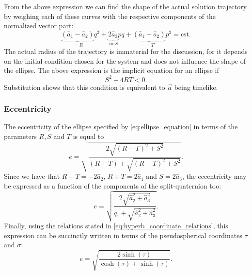 From the above expression we can find the shape of the actual solution trajectory by weighing each of these curves with the respective components of the normalized vector part:
\begin{equation}
    \underbrace{(\hat{a}_1 - \hat{a}_2)}_{\coloneq R} q^2 + \underbrace{2 \hat{a}_3}_{\coloneq S} pq + \underbrace{(\hat{a}_1 + \hat{a}_2)}_{\coloneq T} p^2 = \text{cst}.
    \label{eq:ellipse_equation}
\end{equation}
The actual radius of the trajectory is immaterial for the discussion, for it depends on the initial condition chosen for the system and does not influence the shape of the ellipse. 
The above expression is the implicit equation for an ellipse if \cite{Rapp1991}
\begin{equation}
    S^2 - 4RT < 0.
\end{equation}
Substitution shows that this condition is equivalent to \(\vec{a}\) being timelike. 

\subsubsection{Eccentricity} The eccentricity of the ellipse specified by \cref{eq:ellipse_equation} in terms of the parameters \(R, S\) and  \(T\) is equal to \cite{Rapp1991}
\begin{equation}
    e = \sqrt{\frac{2\sqrt{(R - T)^2 + S^2}}{(R + T) + \sqrt{(R - T)^2 + S^2}}}.
    \label{eq:eccentricity}
\end{equation}
Since we have that \(R - T = -2\hat{a}_2\), \(R + T = 2\hat{a}_1\) and \(S = 2\hat{a}_3\), the eccentricity may be expressed as a function of the components of the split-quaternion too:
\begin{equation}
    e = \sqrt{\frac{2\sqrt{\hat{a}_2^2 + \hat{a}_3^2}}{q_1 + \sqrt{\hat{a}_2^2 + \hat{a}_3^2}}}.
\end{equation}
Finally, using the relations stated in \cref{eq:hyperb_coordinate_relations}, this expression can be succinctly written in terms of the pseudospherical coordinates $\tau$ and $\sigma$:
\begin{equation}
    e = \sqrt{\frac{2\sinh(\tau)}{\cosh(\tau) + \sinh(\tau)}}. 
    \label{eq:e_pseudosphere_coords}
\end{equation}

